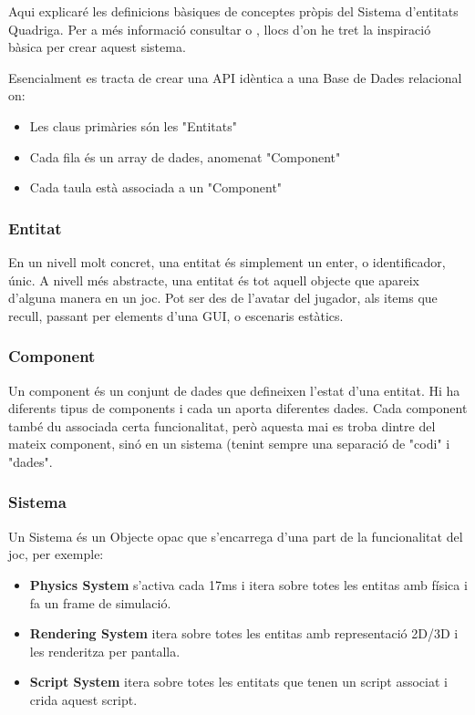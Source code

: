 Aqui explicaré les definicions bàsiques de conceptes pròpis del Sistema d'entitats Quadriga. Per a més informació consultar \cite{EntityWikiB} o \cite{Martin07}, llocs d'on he tret la inspiració bàsica per crear aquest sistema.

Esencialment es tracta de crear una API idèntica a una Base de Dades relacional on:

\begin{itemize}
  \item Les claus primàries són les "Entitats"
  \item Cada fila és un array de dades, anomenat "Component"
  \item Cada taula està associada a un "Component"
\end{itemize}

\subsubsection{Entitat}

En un nivell molt concret, una entitat és simplement un enter, o identificador, únic. A nivell més abstracte, una entitat és tot aquell objecte que apareix d'alguna manera en un joc. Pot ser des de l'avatar del jugador, als items que recull, passant per elements d'una GUI, o escenaris estàtics.

\subsubsection{Component}

Un component és un conjunt de dades que defineixen l'estat d'una entitat. Hi ha diferents tipus de components i cada un aporta diferentes dades. Cada component també du associada certa funcionalitat, però aquesta mai es troba dintre del mateix component, sinó en un sistema (tenint sempre una separació de "codi" i "dades".

\subsubsection{Sistema}

Un Sistema és un Objecte opac que s'encarrega d'una part de la funcionalitat del joc, per exemple:
\begin{itemize}
  \item{\bf Physics System} s'activa cada 17ms i itera sobre totes les entitas amb física i fa un frame de simulació.
  \item{\bf Rendering System} itera sobre totes les entitas amb representació 2D/3D i les renderitza per pantalla.
  \item{\bf Script System} itera sobre totes les entitats que tenen un script associat i crida aquest script.
\end{itemize}

